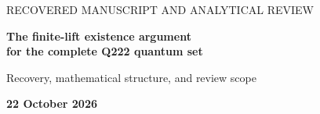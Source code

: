 \documentclass[11pt,a4paper]{article}
\begin{document}
{\large\color{teal} RECOVERED MANUSCRIPT AND ANALYTICAL REVIEW\par}
{\LARGE\bfseries\color{ink} The finite-lift existence argument\\for the complete Q222 quantum set\par}
{\large Recovery, mathematical structure, and review scope\par}
\medskip
\textbf{22 October 2026}





\end{document}
